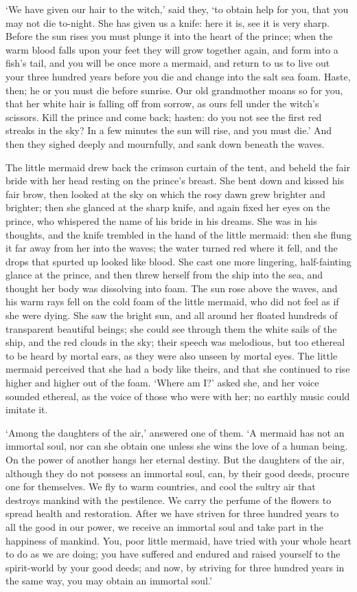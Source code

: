 `We have given our hair to the witch,' said they, `to obtain
help for you, that you may not die to-night. 
She has given us a knife:
here it is, see it is very sharp. 
Before the sun rises you must plunge
it into the heart of the prince; when the warm blood falls upon your
feet they will grow together again, and form into a fish's tail, and
you will be once more a mermaid, and return to us to live out your
three hundred years before you die and change into the salt sea
foam. 
Haste, then; he or you must die before sunrise. 
Our old
grandmother moans so for you, that her white hair is falling off
from sorrow, as ours fell under the witch's scissors. 
Kill the
prince and come back; hasten: do you not see the first red streaks
in the sky? In a few minutes the sun will rise, and you must die.' And
then they sighed deeply and mournfully, and sank down beneath the
waves.

The little mermaid drew back the crimson curtain of the tent,
and beheld the fair bride with her head resting on the prince's
breast. 
She bent down and kissed his fair brow, then looked at the sky
on which the rosy dawn grew brighter and brighter; then she glanced at
the sharp knife, and again fixed her eyes on the prince, who whispered
the name of his bride in his dreams. 
She was in his thoughts, and
the knife trembled in the hand of the little mermaid: then she flung
it far away from her into the waves; the water turned red where it
fell, and the drops that spurted up looked like blood. 
She cast one
more lingering, half-fainting glance at the prince, and then threw
herself from the ship into the sea, and thought her body was
dissolving into foam. 
The sun rose above the waves, and his warm
rays fell on the cold foam of the little mermaid, who did not feel
as if she were dying. 
She saw the bright sun, and all around her
floated hundreds of transparent beautiful beings; she could see
through them the white sails of the ship, and the red clouds in the
sky; their speech was melodious, but too ethereal to be heard by
mortal ears, as they were also unseen by mortal eyes. 
The little
mermaid perceived that she had a body like theirs, and that she
continued to rise higher and higher out of the foam. 
`Where am I?'
asked she, and her voice sounded ethereal, as the voice of those who
were with her; no earthly music could imitate it.

`Among the daughters of the air,' answered one of them. 
`A mermaid
has not an immortal soul, nor can she obtain one unless she wins the
love of a human being. 
On the power of another hangs her eternal
destiny. 
But the daughters of the air, although they do not possess an
immortal soul, can, by their good deeds, procure one for themselves.
We fly to warm countries, and cool the sultry air that destroys
mankind with the pestilence. 
We carry the perfume of the flowers to
spread health and restoration. 
After we have striven for three hundred
years to all the good in our power, we receive an immortal soul and
take part in the happiness of mankind. 
You, poor little mermaid,
have tried with your whole heart to do as we are doing; you have
suffered and endured and raised yourself to the spirit-world by your
good deeds; and now, by striving for three hundred years in the same
way, you may obtain an immortal soul.'


